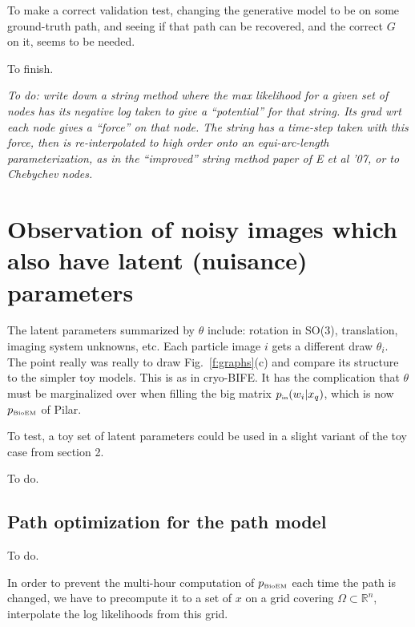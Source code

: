\documentclass[10pt]{article}
\newcommand{\tbox}[1]{{\mbox{\tiny #1}}}
\newcommand{\R}{\mathbb{R}}
\begin{document}
To make a correct validation test, changing the generative
model to be on some ground-truth path, and seeing if that path
can be recovered, and the correct $G$ on it, seems to be needed.


To finish.

{\em To do: write down a string method where the max likelihood for a given
  set of nodes has its negative log taken to give a ``potential'' for that string. Its grad wrt each node gives a ``force'' on that node. The string has a time-step taken with this force, then is re-interpolated to high order onto an equi-arc-length parameterization, as in the ``improved'' string method paper of E et al '07, or to Chebychev nodes.}



\section{Observation of noisy images which also have latent (nuisance) parameters}


The latent parameters summarized by $\theta$ include:
rotation in SO(3), translation, imaging system unknowns, etc.
Each particle image $i$ gets a different draw $\theta_i$.
The point really was really to draw Fig.~\ref{f:graphs}(c)
and compare its structure to the simpler toy models.
This is as in cryo-BIFE.
It has the complication that $\theta$ must be marginalized over
when filling the big matrix $p_\tbox{in}(w_i | x_q)$, which is now
$p_\tbox{BioEM}$ of Pilar.

To test, a toy set of latent parameters
could be used in a slight variant of the toy case from section 2.

To do.

\subsection{Path optimization for the path model}

To do.

In order to prevent the multi-hour computation of $p_\tbox{BioEM}$ each
time the path is changed, we have to precompute it to a set of $x$ on a
grid covering $\Omega \subset \R^n$,
interpolate the log likelihoods from this grid.






\end{document}
